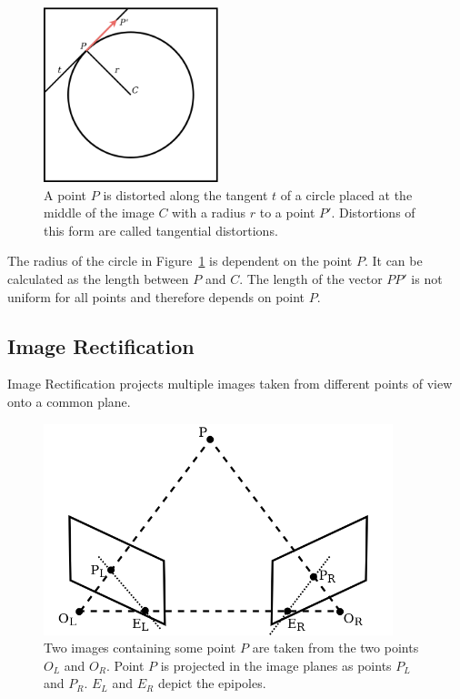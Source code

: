 \begin{figure}[h!]
	\centering
	\includegraphics[width=2in]{img/methodology_stereoCamera_distortion_tangentialDistortion.png}
	\caption{A point $P$ is distorted along the tangent $t$ of a circle placed at the middle of the image $C$ with a radius $r$ to a point $P'$. Distortions of this form are called tangential distortions.}
	\label{pic:methodology_stereoCamera_distortion_tangentialDistortion}
\end{figure}

The radius of the circle in Figure~\ref{pic:methodology_stereoCamera_distortion_tangentialDistortion} is dependent on the point $P$. It can be calculated as the length between $P$ and $C$. The length of the vector $PP'$ is not uniform for all points and therefore depends on point $P$.

\subsection{Image Rectification}
Image Rectification projects multiple images taken from different points of view onto a common plane. 

\begin{figure}[h!]
	\centering
	\includegraphics[width=4in]{img/methodology_stereoCamera_imageRectification.png}
	\caption{Two images containing some point $P$ are taken from the two points $O_L$ and $O_R$. Point $P$ is projected in the image planes as points $P_L$ and $P_R$. $E_L$ and $E_R$ depict the epipoles.}
	\label{pic:methodology_stereoCamera_imageRectification}
\end{figure}


